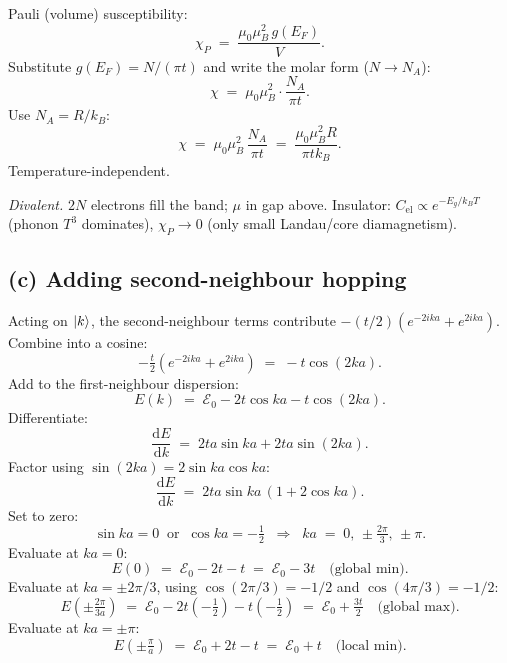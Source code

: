 \documentclass[11pt]{article}
\newcommand{\de}{\mathrm{d}}
\begin{document}
Pauli (volume) susceptibility:
\[
\chi_P \;=\; \frac{\mu_0\mu_B^2\, g(E_F)}{V}.
\]
Substitute $g(E_F)=N/(\pi t)$ and write the molar form ($N\to N_A$):
\[
\chi \;=\; \mu_0\mu_B^2\cdot\frac{N_A}{\pi t}.
\]
Use $N_A = R/k_B$:
\begin{equation}
\boxed{\;\chi \;=\; \mu_0 \mu_B^{2}\,\frac{N_A}{\pi t}\;=\;\frac{\mu_0\mu_B^{2} R}{\pi t k_B}.\;}
\label{eq:chiPauli}
\end{equation}
Temperature-independent.

\emph{Divalent.} $2N$ electrons fill the band; $\mu$ in gap above. Insulator: $C_{\text{el}}\propto e^{-E_g/k_BT}$ (phonon $T^3$ dominates), $\chi_P\to 0$ (only small Landau/core diamagnetism).

\subsection*{(c) Adding second-neighbour hopping}

Acting on $\ket k$, the second-neighbour terms contribute $-(t/2)(e^{-2ika}+e^{2ika})$. Combine into a cosine:
\[
-\tfrac{t}{2}(e^{-2ika}+e^{2ika}) \;=\; -t\cos(2ka).
\]
Add to the first-neighbour dispersion:
\begin{equation}
\boxed{\;E(k) \;=\; \mathcal{E}_0 - 2 t \cos ka - t \cos(2ka).\;}
\label{eq:Ek2}
\end{equation}
Differentiate:
\[
\frac{\de E}{\de k} \;=\; 2ta\sin ka + 2ta\sin(2ka).
\]
Factor using $\sin(2ka)=2\sin ka\cos ka$:
\[
\frac{\de E}{\de k} \;=\; 2ta\sin ka\,(1+2\cos ka).
\]
Set to zero:
\[
\sin ka=0\;\;\text{or}\;\;\cos ka=-\tfrac12 \;\;\Rightarrow\;\; ka \;=\; 0,\,\pm\tfrac{2\pi}{3},\,\pm\pi.
\]
Evaluate at $ka=0$:
\[
E(0) \;=\; \mathcal{E}_0 - 2t - t \;=\; \mathcal{E}_0 - 3t\quad\text{(global min)}.
\]
Evaluate at $ka=\pm 2\pi/3$, using $\cos(2\pi/3)=-1/2$ and $\cos(4\pi/3)=-1/2$:
\[
E\!\left(\pm\tfrac{2\pi}{3a}\right) \;=\; \mathcal{E}_0 - 2t(-\tfrac12) - t(-\tfrac12) \;=\; \mathcal{E}_0 + \tfrac{3t}{2}\quad\text{(global max)}.
\]
Evaluate at $ka=\pm\pi$:
\[
E\!\left(\pm\tfrac{\pi}{a}\right) \;=\; \mathcal{E}_0 + 2t - t \;=\; \mathcal{E}_0 + t\quad\text{(local min)}.
\]
\end{document}
